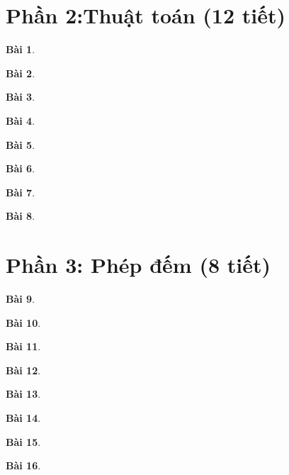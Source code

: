 \documentclass[11pt, oneside,openright,a4paper]{book}
\newtheorem{bt}{Bài }[section]
\begin{document}
\newpage
\section[Phần 2. Thuật toán (12 tiết)]{Phần 2:Thuật toán (12 tiết)}
\begin{bt}

\end{bt}
\begin{bt}

\end{bt}
\begin{bt}

\end{bt}
\begin{bt}

\end{bt}
\begin{bt}

\end{bt}
\begin{bt}

\end{bt}
\begin{bt}

\end{bt}
\begin{bt}

\end{bt}

\newpage
\section[Phần 3. Phép đếm (8 tiết)]{Phần 3: Phép đếm (8 tiết)}
\begin{bt}

\end{bt}
\begin{bt}

\end{bt}
\begin{bt}

\end{bt}
\begin{bt}

\end{bt}
\begin{bt}

\end{bt}
\begin{bt}

\end{bt}
\begin{bt}

\end{bt}
\begin{bt}

\end{bt}
\newpage
\end{document}
